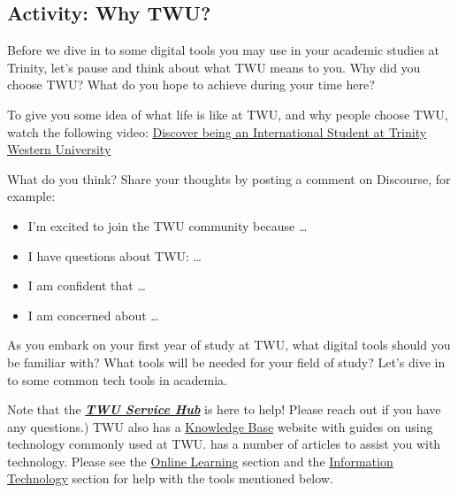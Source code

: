 \documentclass[
]{book}
\providecommand{\tightlist}{%
  \setlength{\itemsep}{0pt}\setlength{\parskip}{0pt}}
\theoremstyle{definition}
\theoremstyle{definition}
\theoremstyle{definition}
\theoremstyle{definition}
\theoremstyle{remark}
\begin{document}
\hypertarget{activity-why-twu}{%
\subsection*{Activity: Why TWU?}\label{activity-why-twu}}

\begin{reflect}
Before we dive in to some digital tools you may use in your academic studies at Trinity, let's pause and think about what TWU means to you. Why did you choose TWU? What do you hope to achieve during your time here?

To give you some idea of what life is like at TWU, and why people choose TWU, watch the following video: \href{https://www.youtube.com/watch?v=VkyZjv3ZbXg}{Discover being an International Student at Trinity Western University}

What do you think? Share your thoughts by posting a comment on Discourse, for example:

\begin{itemize}
\tightlist
\item
  I'm excited to join the TWU community because \ldots{}
\item
  I have questions about TWU: \ldots{}
\item
  I am confident that \ldots{}
\item
  I am concerned about \ldots{}
\end{itemize}
\end{reflect}

As you embark on your first year of study at TWU, what digital tools should you be familiar with? What tools will be needed for your field of study? Let's dive in to some common tech tools in academia.

\begin{feedback}
Note that the
\href{https://trinitywestern.teamdynamix.com/TDClient/1904/Portal/KB/ArticleDet?ID=16267}{\textbf{\emph{TWU
Service Hub}}} is here to help! Please reach out if you have any
questions.) TWU also has a
\href{https://trinitywestern.teamdynamix.com/TDClient/1904/Portal/KB/}{Knowledge
Base} website with guides on using technology commonly used at TWU. has
a number of articles to assist you with technology. Please see the
\href{https://trinitywestern.teamdynamix.com/TDClient/1904/Portal/KB/?CategoryID=4747}{Online
Learning} section and the
\href{https://trinitywestern.teamdynamix.com/TDClient/1904/Portal/KB/?CategoryID=21800}{Information
Technology} section for help with the tools mentioned below.
\end{feedback}
\end{document}
